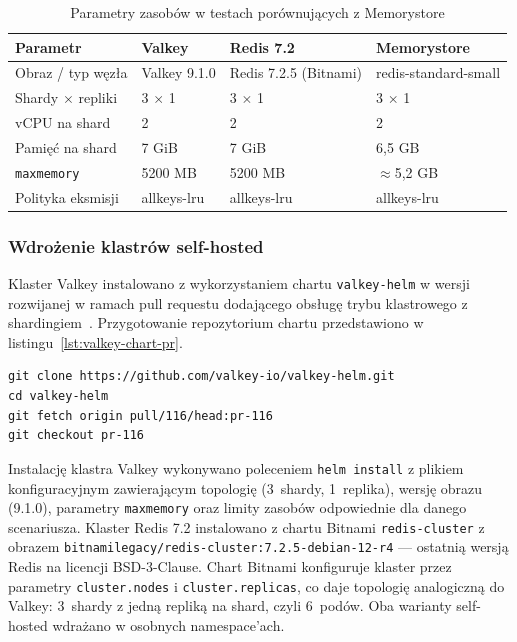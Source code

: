 \begin{table}[H]
\centering
\caption{Parametry zasobów w testach porównujących z Memorystore}
\label{tab:normalizacja_zasobow}
\begin{tabularx}{\textwidth}{p{3.8cm}XXX}
\toprule
\textbf{Parametr} & \textbf{Valkey} & \textbf{Redis 7.2} & \textbf{Memorystore} \\
\midrule
Obraz / typ węzła & Valkey 9.1.0 & Redis 7.2.5 (Bitnami) & redis-standard-small \\
Shardy $\times$ repliki & 3 $\times$ 1 & 3 $\times$ 1 & 3 $\times$ 1 \\
vCPU na shard & 2 & 2 & 2 \\
Pamięć na shard & 7 GiB & 7 GiB & 6{,}5 GB \\
\texttt{maxmemory} & 5200 MB & 5200 MB & $\approx$5{,}2 GB \\
Polityka eksmisji & allkeys-lru & allkeys-lru & allkeys-lru \\
\bottomrule
\end{tabularx}
\end{table}

\subsubsection{Wdrożenie klastrów self-hosted}

Klaster Valkey instalowano z wykorzystaniem chartu \texttt{valkey-helm} w wersji rozwijanej w ramach pull requestu dodającego obsługę trybu klastrowego z shardingiem~\cite{valkeyHelmPr116}. Przygotowanie repozytorium chartu przedstawiono w listingu~\ref{lst:valkey-chart-pr}.

\begin{lstlisting}[basicstyle=\ttfamily\footnotesize,columns=fullflexible,keepspaces=true,breaklines=true,breakatwhitespace=true,frame=single,framerule=0.2pt,caption={Przygotowanie chartu Valkey},label={lst:valkey-chart-pr}]
git clone https://github.com/valkey-io/valkey-helm.git
cd valkey-helm
git fetch origin pull/116/head:pr-116
git checkout pr-116
\end{lstlisting}

Instalację klastra Valkey wykonywano poleceniem \texttt{helm install} z plikiem konfiguracyjnym zawierającym topologię (3~shardy, 1~replika), wersję obrazu (9.1.0), parametry \texttt{maxmemory} oraz limity zasobów odpowiednie dla danego scenariusza. Klaster Redis 7.2 instalowano z chartu Bitnami \texttt{redis-cluster} z obrazem \texttt{bitnamilegacy/redis-cluster:7.2.5-debian-12-r4} --- ostatnią wersją Redis na licencji BSD-3-Clause. Chart Bitnami konfiguruje klaster przez parametry \texttt{cluster.nodes} i \texttt{cluster.replicas}, co daje topologię analogiczną do Valkey: 3~shardy z jedną repliką na shard, czyli 6~podów. Oba warianty self-hosted wdrażano w osobnych namespace'ach.

